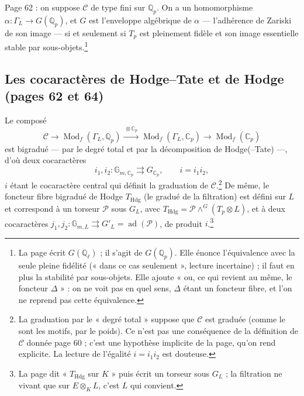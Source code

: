 \documentclass[11pt,a4paper]{article}
\begin{document}
Page 62 : on suppose $\mathscr{C}$ de type fini sur $\mathbb{Q}_{p}$. On a
un homomorphisme $\alpha\colon \Gamma_{L} \to G(\mathbb{Q}_{p})$, et $G$ est
l'enveloppe algébrique de $\alpha$ — l'adhérence de Zariski de son image —
si et seulement si $T_{p}$ est pleinement fidèle et son image essentielle
stable par sous-objets.\footnote{La page écrit $G(\mathbb{Q}_{\ell})$ ; il
s'agit de $G(\mathbb{Q}_{p})$. Elle énonce l'équivalence avec la seule pleine
fidélité (« dans ce cas seulement », lecture incertaine) ; il faut en plus la
stabilité par sous-objets. Elle ajoute « ou, ce qui revient au même, le
foncteur $\Delta$ » : on ne voit pas en quel sens, $\Delta$ étant un foncteur
fibre, et l'on ne reprend pas cette équivalence.}

\subsection*{Les cocaractères de Hodge--Tate et de Hodge (pages 62 et 64)}

Le composé
\[
\mathscr{C} \to \operatorname{Mod}_{f}(\Gamma_{L}, \mathbb{Q}_{p})
\xrightarrow{\ \otimes \mathbb{C}_{p}\ } \operatorname{Mod}_{f}(\Gamma_{L},
\mathbb{C}_{p}) \to \operatorname{Mod}_{f}(\mathbb{C}_{p})
\]
est bigradué — par le degré total et par la décomposition de Hodge(--Tate) —,
d'où deux cocaractères
\[
i_{1}, i_{2}\colon \mathbb{G}_{m,\mathbb{C}_{p}} \rightrightarrows
G_{\mathbb{C}_{p}}, \qquad i = i_{1}i_{2},
\]
$i$ étant le cocaractère central qui définit la graduation de
$\mathscr{C}$.\footnote{La graduation par le « degré total » suppose que
$\mathscr{C}$ est graduée (comme le sont les motifs, par le poids). Ce n'est
pas une conséquence de la définition de $\mathscr{C}$ donnée page 60 ; c'est
une hypothèse implicite de la page, qu'on rend explicite. La lecture de
l'égalité $i = i_{1}i_{2}$ est douteuse.} De même, le foncteur fibre
bigradué de Hodge $T_{\mathrm{Hdg}}$ (le gradué de la filtration) est défini
sur $L$ et correspond à un torseur $\mathcal{P}$ sous $G_{L}$, avec
$T_{\mathrm{Hdg}} = \mathcal{P} \wedge^{G} (T_{p} \otimes L)$, et à deux
cocaractères $j_{1}, j_{2}\colon \mathbb{G}_{m,L} \rightrightarrows G'_{L} =
\operatorname{ad}(\mathcal{P})$, de produit $i$.\footnote{La page dit
« $T_{\mathrm{Hdg}}$ sur $K$ » puis écrit un torseur sous $G_{L}$ ; la
filtration ne vivant que sur $E \otimes_{K} L$, c'est $L$ qui convient.}
\end{document}
